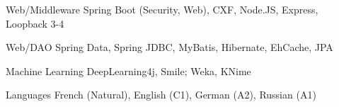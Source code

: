 \begin{cvskills}
  \cvskill
  {Web/Middleware} %
  {Spring Boot (Security, Web), CXF, Node.JS, Express, Loopback 3-4} %
  
  
  \cvskill
  {Web/DAO} %
  {Spring Data, Spring JDBC, MyBatis, Hibernate, EhCache, JPA} %

  \cvskill
  {Machine Learning} %
  {DeepLearning4j, Smile; Weka, KNime} %
  

  \cvskill
    {Languages} %
    {French (Natural), English (C1), German (A2), Russian (A1)} %

\end{cvskills}
